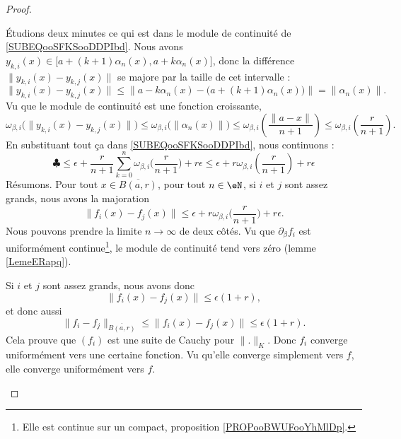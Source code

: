 \begin{proof}
\begin{subproof}
\begin{itemize}
    \end{itemize}
    Étudions deux minutes ce qui est dans le module de continuité de \eqref{SUBEQooSFKSooDDPIbd}. Nous avons \( y_{k,i}(x)\in\mathopen\big[ a+(k+1)\alpha_n(x) , a+k\alpha_n(x) \mathclose]\), donc la différence \( \| y_{k,i}(x)-y_{k,j}(x) \|\) se majore par la taille de cet intervalle :
    \begin{equation}
        \| y_{k,i}(x)-y_{k,j}(x) \|\leq \| a-k\alpha_n(x)-\big( a+(k+1)\alpha_n(x) \big) \|=\| \alpha_n(x) \|.
    \end{equation}
    Vu que le module de continuité est une fonction croissante,
    \begin{equation}
        \omega_{\beta,i}\big( \| y_{k,i}(x)-y_{k,j}(x) \| \big)\leq \omega_{\beta,i}\big( \| \alpha_n(x) \| \big)\leq \omega_{\beta,i}\left( \frac{ \| a-x \| }{ n+1 } \right)\leq \omega_{\beta,i}\left( \frac{ r }{ n+1 } \right).
    \end{equation}
    En substituant tout ça dans \eqref{SUBEQooSFKSooDDPIbd}, nous continuons :
    \begin{equation}
            \clubsuit\leq \epsilon+\frac{ r }{ n+1 }\sum_{k=0}^n\omega_{\beta,i}\big(  \frac{ r }{ n+1 }  \big)+r\epsilon
            \leq \epsilon+r\omega_{\beta,i}\left( \frac{ r }{ n+1 } \right)+r\epsilon
    \end{equation}
    Résumons. Pour tout \( x\in \overline{ B(a,r) }\), pour tout \( n\in \eN\), si \( i\) et \( j\) sont assez grands, nous avons la majoration
    \begin{equation}
        \| f_i(x)-f_j(x) \|\leq \epsilon+r\omega_{\beta,i}\big( \frac{ r }{ n+1 } \big)+r\epsilon.
    \end{equation}
    Nous pouvons prendre la limite \( n\to \infty\) de deux côtés. Vu que \( \partial_{\beta}f_i\) est uniformément continue\footnote{Elle est continue sur un compact, proposition \ref{PROPooBWUFooYhMlDp}.}, le module de continuité tend vers zéro (lemme \ref{LemeERapq}).

    Si \( i\) et \( j\) sont assez grands, nous avons donc
    \begin{equation}
        \| f_i(x)-f_j(x) \|\leq \epsilon(1+r),
    \end{equation}
    et donc aussi
    \begin{equation}
        \| f_i-f_j \|_{\overline{ B(a,r) }}\leq \| f_i(x)-f_j(x) \|\leq \epsilon(1+r).
    \end{equation}
    Cela prouve que \( (f_i)\) est une suite de Cauchy pour \( \| . \|_K\). Donc \( f_i\) converge uniformément vers une certaine fonction. Vu qu'elle converge simplement vers \( f\), elle converge uniformément vers \( f\).


\end{subproof}
\end{proof}
